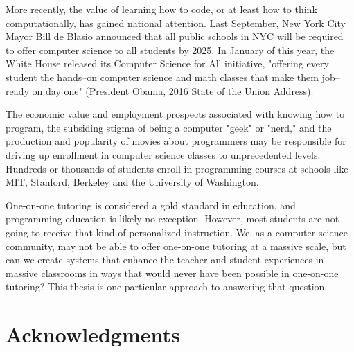 \documentclass[12pt,twoside]{mitthesis}
\begin{document}
More recently, the value of learning how to code, or at least how to think computationally, has gained national attention. Last September, New York City Mayor Bill de Blasio announced that all public schools in NYC will be required to offer computer science to all students by 2025. In January of this year, the White House released its Computer Science for All initiative, "offering every student the hands--on computer science and math classes that make them job--ready on day one" (President Obama, 2016 State of the Union Address).

The economic value and employment prospects associated with knowing how to program, the subsiding stigma of being a computer "geek" or "nerd," and the production and popularity of movies about programmers may be responsible for driving up enrollment in computer science classes to unprecedented levels. Hundreds or thousands of students enroll in programming courses at schools like MIT, Stanford, Berkeley and the University of Washington.

One-on-one tutoring is considered a gold standard in education, and programming education is likely no exception. However, most students are not going to receive that kind of personalized instruction. We, as a computer science community, may not be able to offer one-on-one tutoring at a massive scale, but can we create systems that enhance the teacher and student experiences in massive classrooms in ways that would never have been possible in one-on-one tutoring? This thesis is one particular approach to answering that question. %


\cleardoublepage

\section*{Acknowledgments}
\end{document}
